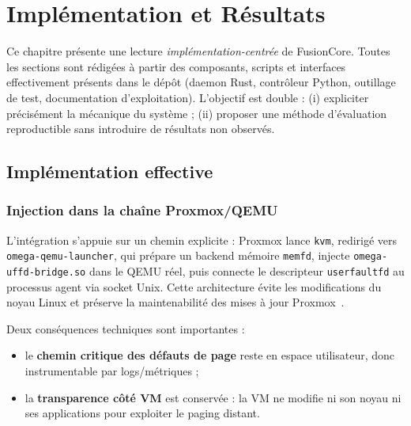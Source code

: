 \chapter{Implémentation et Résultats}
\label{ch:implementation-resultats}

Ce chapitre présente une lecture \emph{implémentation-centrée} de FusionCore. Toutes les sections sont rédigées à partir des composants, scripts et interfaces effectivement présents dans le dépôt (daemon Rust, contrôleur Python, outillage de test, documentation d’exploitation). L’objectif est double : (i) expliciter précisément la mécanique du système ; (ii) proposer une méthode d’évaluation reproductible sans introduire de résultats non observés.

\section{Implémentation effective}
\label{sec:mise-en-oeuvre}

\subsection{Injection dans la chaîne Proxmox/QEMU}

L’intégration s’appuie sur un chemin explicite : Proxmox lance \texttt{kvm}, redirigé vers \texttt{omega-qemu-launcher}, qui prépare un backend mémoire \texttt{memfd}, injecte \texttt{omega-uffd-bridge.so} dans le QEMU réel, puis connecte le descripteur \texttt{userfaultfd} au processus agent via socket Unix. Cette architecture évite les modifications du noyau Linux et préserve la maintenabilité des mises à jour Proxmox~\cite{proxmox_doc,qemu_doc,kvm_doc}.

Deux conséquences techniques sont importantes :
\begin{itemize}
    \item le \textbf{chemin critique des défauts de page} reste en espace utilisateur, donc instrumentable par logs/métriques ;
    \item la \textbf{transparence côté VM} est conservée : la VM ne modifie ni son noyau ni ses applications pour exploiter le paging distant.
\end{itemize}

